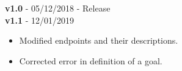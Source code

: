 \textbf{v1.0} - 05/12/2018 - Release \\
\newline
\textbf{v1.1} - 12/01/2019 \\
\begin{itemize}
    \item Modified endpoints and their descriptions.
    \item Corrected error in definition of a goal.
\end{itemize}
